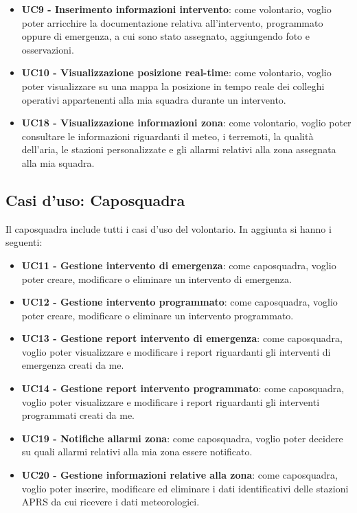 \begin{itemize}
	\item \textbf{UC9 - Inserimento informazioni intervento}:
	come volontario, voglio poter arricchire la documentazione relativa all'intervento, programmato oppure di emergenza, a cui sono stato assegnato, aggiungendo foto e osservazioni.
	
	\item \textbf{UC10 - Visualizzazione posizione real-time}:
	come volontario, voglio poter visualizzare su una mappa la posizione in tempo reale dei colleghi operativi appartenenti alla mia squadra durante un intervento.
	
	\item \textbf{UC18 - Visualizzazione informazioni zona}:
	come volontario, voglio poter consultare le informazioni riguardanti il meteo, i terremoti, la qualità dell'aria, le stazioni personalizzate e gli allarmi relativi alla zona assegnata alla mia squadra.
\end{itemize}




\subsection{Casi d'uso: Caposquadra}
Il caposquadra include tutti i casi d'uso del volontario. In aggiunta si hanno i seguenti:
\begin{itemize}
	\item \textbf{UC11 - Gestione intervento di emergenza}:
	come caposquadra, voglio poter creare, modificare o eliminare un intervento di emergenza.
	
	\item \textbf{UC12 - Gestione intervento programmato}:
	come caposquadra, voglio poter creare, modificare o eliminare un intervento programmato.
	
	\item \textbf{UC13 - Gestione report intervento di emergenza}:
	come caposquadra, voglio poter visualizzare e modificare i report riguardanti gli interventi di emergenza creati da me.
	
	\item \textbf{UC14 - Gestione report intervento programmato}:
	come caposquadra, voglio poter visualizzare e modificare i report riguardanti gli interventi programmati creati da me.
		
	\item \textbf{UC19 - Notifiche allarmi zona}:
	come caposquadra, voglio poter decidere su quali  allarmi relativi alla mia zona essere notificato.
	
	\item \textbf{UC20 - Gestione informazioni relative alla zona}:
	come caposquadra, voglio poter inserire, modificare ed eliminare i dati identificativi delle stazioni APRS da cui ricevere i dati meteorologici.
\end{itemize}

